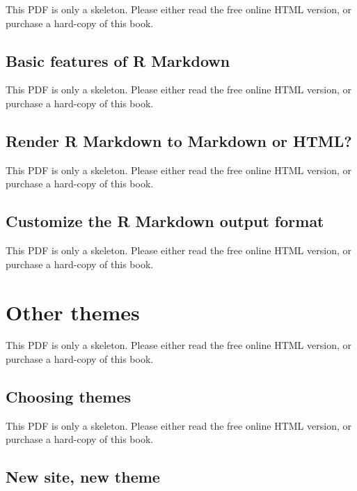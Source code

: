 \documentclass[
  12pt,
]{krantz}
\begin{document}
This PDF is only a skeleton. Please either read the free online HTML version, or purchase a hard-copy of this book.

\begin{table}\caption{\label{tab:md-diff} Differences among the three document formats.}\end{table}

\subsection{Basic features of R Markdown}\label{basic-features-of-r-markdown}

This PDF is only a skeleton. Please either read the free online HTML version, or purchase a hard-copy of this book.

\subsection{Render R Markdown to Markdown or HTML?}\label{blogdown-method}

This PDF is only a skeleton. Please either read the free online HTML version, or purchase a hard-copy of this book.

\subsection{Customize the R Markdown output format}\label{customize-the-r-markdown-output-format}

This PDF is only a skeleton. Please either read the free online HTML version, or purchase a hard-copy of this book.

\section{Other themes}\label{other-themes}

This PDF is only a skeleton. Please either read the free online HTML version, or purchase a hard-copy of this book.

\subsection{Choosing themes}\label{choosing-themes}

This PDF is only a skeleton. Please either read the free online HTML version, or purchase a hard-copy of this book.

\subsection{New site, new theme}\label{new-site-new-theme}
\end{document}
